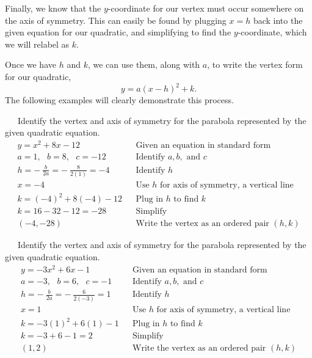 
Finally, we know that the $y$-coordinate for our vertex must occur somewhere on the axis of symmetry.  This can easily be found by plugging $x=h$ back into the given equation for our quadratic, and simplifying to find the $y$-coordinate, which we will relabel as $k$.\pp

Once we have $h$ and $k$, we can use them, along with $a$, to write the vertex form for our quadratic, $$y=a(x-h)^2+k.$$%
The following examples will clearly demonstrate this process.\\

\begin{example}~~~Identify the vertex and axis of symmetry for the parabola represented by the given quadratic equation.
\begin{eqnarray*}
y=x^2+8x-12       &  & \text{Given an equation in standard form}\\              
a=1,~~~b=8,~~~c=-12       &  & \text{Identify~} a,b, \text{~and~} c\\             
h=-~\frac{b}{2a}=-~\frac{8}{2(1)}=-4 & & \text{Identify~} h\\
x=-4 & & \text{Use~} h \text{~for~axis~of~symmetry,~a~vertical~line}\\
k= (-4)^2+8(-4)-12   &  & \text{Plug in~} h \text{~to~find~} k\\
k= 16-32-12= -28  &  &\mathrm{Simplify}\\
(-4,-28)    &  & \text{Write the vertex as an ordered pair $(h,k)$}
\end{eqnarray*}
\end{example}
\begin{example}~~~Identify the vertex and axis of symmetry for the parabola represented by the given quadratic equation.
\begin{eqnarray*}
y=-3x^2+6x-1      &  &\text{Given an equation in standard form}\\              
a=-3,~~~b=6,~~~c=-1       &  & \text{Identify~} a,b, \text{~and~} c\\             
h=-~\frac{b}{2a}=-~\frac{6}{2(-3)}=1 & & \text{Identify~} h\\
x=1 & & \text{Use~} h \text{~for~axis~of~symmetry,~a~vertical~line}\\
k= -3(1)^2+6(1)-1   &  & \text{Plug in~} h \text{~to~find~} k\\
k= -3+6-1= 2  &  &\mathrm{Simplify}\\
(1,2)    &  & \text{Write the vertex as an ordered pair $(h,k)$}
\end{eqnarray*}
\end{example}
